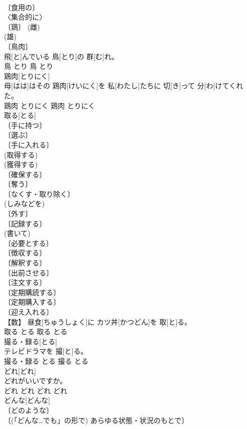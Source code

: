 \documentclass[8pt]{extreport}
\begin{document}
\begin{CJK}{UTF8}{min}
\\	〔食用の〕 
\\	〈集合的に〉 
\\	〔鶏〕 (雌) 
\\	(雄) 
\\	〔鳥肉〕 
\\	飛[と]んでいる 鳥[とり]の 群[む]れ。	
\\	鳥	とり	鳥	とり	
\\	鶏肉[とりにく]	
\\	母[はは]はその 鶏肉[けいにく]を 私[わたし]たちに 切[き]って 分[わ]けてくれた。	
\\	鶏肉	とりにく	鶏肉	とりにく	
\\	取る[とる]	
\\	〔手に持つ〕 
\\	〔選ぶ〕 
\\	〔手に入れる〕 
\\	(取得する) 
\\	(獲得する) 
\\	〔確保する〕 
\\	〔奪う〕 
\\	〔なくす・取り除く〕 
\\	(しみなどを) 
\\	〔外す〕 
\\	〔記録する〕 
\\	(書いて) 
\\	〔必要とする〕 
\\	〔徴収する〕 
\\	〔解釈する〕 
\\	〔出前させる〕 
\\	〔注文する〕 
\\	〔定期購読する〕 
\\	〔定期購入する〕 
\\	〔迎え入れる〕 
\\	【数】	昼食[ちゅうしょく]に カツ丼[かつどん]を 取[と]る。	
\\	取る	とる	取る	とる	
\\	撮る・録る[とる]	
\\	テレビドラマを 撮[と]る。	
\\	撮る・録る	とる	撮る	とる	
\\	どれ[どれ]	
\\	どれがいいですか。	
\\	どれ	どれ	どれ	どれ	
\\	どんな[どんな]	
\\	〔どのような〕 
\\	〔(「どんな…でも」の形で) あらゆる状態・状況のもとで〕 

\end{CJK}
\end{document}
